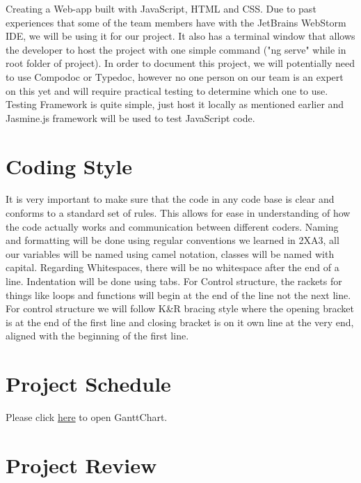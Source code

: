 \documentclass{article}
\begin{document}
Creating a Web-app built with JavaScript, HTML and CSS. Due to past experiences that some of the team members have with the JetBrains WebStorm IDE, we will be using it for our project. It also has a terminal window that allows the developer to host the project with one simple command ("ng serve" while in root folder of project). In order to document this project, we will potentially need to use Compodoc or Typedoc, however no one person on our team is an expert on this yet and will require practical testing to determine which one to use. Testing Framework is quite simple, just host it locally as mentioned earlier and Jasmine.js framework will be used to test JavaScript code. 

\section{Coding Style}
It is very important to make sure that the code in any code base is clear and conforms to a standard set of rules. This allows for ease in understanding of how the code actually works and communication between different coders. Naming and formatting will be done using regular conventions we learned in 2XA3, all our variables will be named using camel notation, classes will be named with capital. Regarding Whitespaces, there will be no whitespace after the end of a line. Indentation will be done using tabs. For Control structure, the rackets for things like loops and functions will begin at the end of the line not the next line. For control structure we will follow K\&R bracing style where the opening bracket is at the end of the first line and closing bracket is on it own line at the very end, aligned with the beginning of the first line. 

\section{Project Schedule}
Please click \href{run:../../ProjectSchedule/GanttChart.gan}{here} to open GanttChart.

\section{Project Review}
\end{document}

